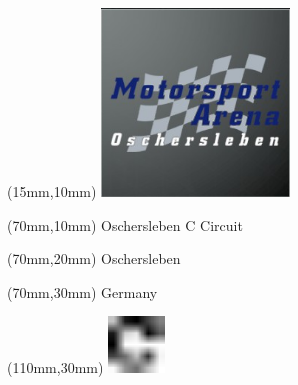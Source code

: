 \null\newpage
\begin{textblock*}{50mm}(15mm,10mm)%
\includegraphics[width=50mm]{LG/2015-05-20_00090.png}
\end{textblock*}
\begin{textblock*}{130mm}(70mm,10mm)%
{\fontsize{20}{20}\selectfont Oschersleben C Circuit}\\
\end{textblock*}
\begin{textblock*}{120mm}(70mm,20mm)%
{\fontsize{16}{16}\selectfont Oschersleben}\\
\end{textblock*}
\begin{textblock*}{120mm}(70mm,30mm)%
{\fontsize{12}{12}\selectfont Germany}
\end{textblock*}
\begin{textblock*}{30mm}(110mm,30mm)%
\centering
\includegraphics[height=15mm]{icons/fa-rotate-right.pdf}
\end{textblock*}
